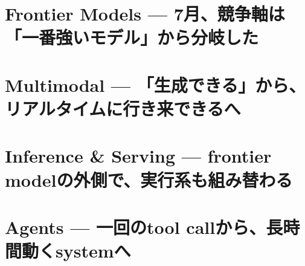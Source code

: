 \documentclass[lualatex,a4paper,11pt]{jlreq}
\begin{document}
\surveycover
\clearpage


\clearpage
\section{Frontier Models — 7月、競争軸は「一番強いモデル」から分岐した}
\label{pkg:frontier-models-july}
\vspace{0.15em}
\begin{multicols}{2}

\end{multicols}
\Needspace{0.34\textheight}

\medskip


\Needspace{0.45\textheight}
\bigskip
\section{Multimodal — 「生成できる」から、リアルタイムに行き来できるへ}
\label{pkg:multimodal-july}
\vspace{0.15em}
\begin{multicols}{2}

\end{multicols}
\Needspace{0.34\textheight}

\medskip


\Needspace{0.45\textheight}
\bigskip
\section{Inference \& Serving — frontier modelの外側で、実行系も組み替わる}
\label{pkg:inference-serving-july}
\vspace{0.15em}
\begin{multicols}{2}

\end{multicols}
\Needspace{0.34\textheight}

\medskip


\Needspace{0.45\textheight}
\bigskip
\section{Agents — 一回のtool callから、長時間動くsystemへ}
\label{pkg:agents-july}
\vspace{0.15em}
\begin{multicols}{2}

\end{multicols}
\Needspace{0.34\textheight}

\medskip

\end{document}
